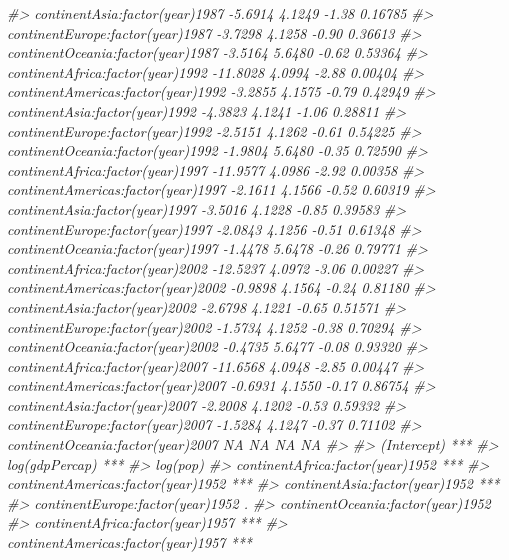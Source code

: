 \documentclass[]{book}
\newenvironment{Shaded}{\begin{snugshade}}{\end{snugshade}}
\newcommand{\CommentTok}[1]{\textcolor[rgb]{0.56,0.35,0.01}{\textit{#1}}}
\begin{document}
\begin{Shaded}
\begin{Highlighting}[]
\CommentTok{#> continentAsia:factor(year)1987      -5.6914     4.1249   -1.38  0.16785}
\CommentTok{#> continentEurope:factor(year)1987    -3.7298     4.1258   -0.90  0.36613}
\CommentTok{#> continentOceania:factor(year)1987   -3.5164     5.6480   -0.62  0.53364}
\CommentTok{#> continentAfrica:factor(year)1992   -11.8028     4.0994   -2.88  0.00404}
\CommentTok{#> continentAmericas:factor(year)1992  -3.2855     4.1575   -0.79  0.42949}
\CommentTok{#> continentAsia:factor(year)1992      -4.3823     4.1241   -1.06  0.28811}
\CommentTok{#> continentEurope:factor(year)1992    -2.5151     4.1262   -0.61  0.54225}
\CommentTok{#> continentOceania:factor(year)1992   -1.9804     5.6480   -0.35  0.72590}
\CommentTok{#> continentAfrica:factor(year)1997   -11.9577     4.0986   -2.92  0.00358}
\CommentTok{#> continentAmericas:factor(year)1997  -2.1611     4.1566   -0.52  0.60319}
\CommentTok{#> continentAsia:factor(year)1997      -3.5016     4.1228   -0.85  0.39583}
\CommentTok{#> continentEurope:factor(year)1997    -2.0843     4.1256   -0.51  0.61348}
\CommentTok{#> continentOceania:factor(year)1997   -1.4478     5.6478   -0.26  0.79771}
\CommentTok{#> continentAfrica:factor(year)2002   -12.5237     4.0972   -3.06  0.00227}
\CommentTok{#> continentAmericas:factor(year)2002  -0.9898     4.1564   -0.24  0.81180}
\CommentTok{#> continentAsia:factor(year)2002      -2.6798     4.1221   -0.65  0.51571}
\CommentTok{#> continentEurope:factor(year)2002    -1.5734     4.1252   -0.38  0.70294}
\CommentTok{#> continentOceania:factor(year)2002   -0.4735     5.6477   -0.08  0.93320}
\CommentTok{#> continentAfrica:factor(year)2007   -11.6568     4.0948   -2.85  0.00447}
\CommentTok{#> continentAmericas:factor(year)2007  -0.6931     4.1550   -0.17  0.86754}
\CommentTok{#> continentAsia:factor(year)2007      -2.2008     4.1202   -0.53  0.59332}
\CommentTok{#> continentEurope:factor(year)2007    -1.5284     4.1247   -0.37  0.71102}
\CommentTok{#> continentOceania:factor(year)2007        NA         NA      NA       NA}
\CommentTok{#>                                       }
\CommentTok{#> (Intercept)                        ***}
\CommentTok{#> log(gdpPercap)                     ***}
\CommentTok{#> log(pop)                              }
\CommentTok{#> continentAfrica:factor(year)1952   ***}
\CommentTok{#> continentAmericas:factor(year)1952 ***}
\CommentTok{#> continentAsia:factor(year)1952     ***}
\CommentTok{#> continentEurope:factor(year)1952   .  }
\CommentTok{#> continentOceania:factor(year)1952     }
\CommentTok{#> continentAfrica:factor(year)1957   ***}
\CommentTok{#> continentAmericas:factor(year)1957 ***}

\end{Highlighting}
\end{Shaded}
\end{document}
